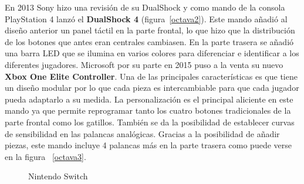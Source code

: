 En 2013 Sony hizo una revisi\'on de su DualShock y como mando de la consola PlayStation 4 lanz\'o el \textbf{DualShock 4} (figura~\ref{octava2}). Este mando a\~nadi\'o al dise\~no anterior un panel t\'actil en la parte frontal, lo que hizo que la distribuci\'on de los botones que antes eran centrales cambiasen. En la parte trasera se a\~nadi\'o una barra LED que se ilumina en varios colores para diferenciar e identificar a los diferentes jugadores. Microsoft por su parte en 2015 puso a la venta su nuevo \textbf{Xbox One Elite Controller}. Una de las principales caracter\'isticas es que tiene un dise\~no modular por lo que cada pieza es intercambiable para que cada jugador pueda adaptarlo a su medida. La personalizaci\'on es el principal aliciente en este mando ya que permite reprogramar tanto los cuatro botones tradicionales de la parte frontal como los gatillos. Tambi\'en se da la posibilidad de establecer curvas de sensibilidad en las palancas anal\'ogicas. Gracias a la posibilidad de a\~nadir piezas, este mando incluye 4 palancas m\'as en la parte trasera como puede verse en la figura~ \ref{octava3}.\\

\begin{figure}[t]
     \hfill
{}
     \caption{Nintendo Switch}
     \label{fig:octava2}
   \end{figure}


